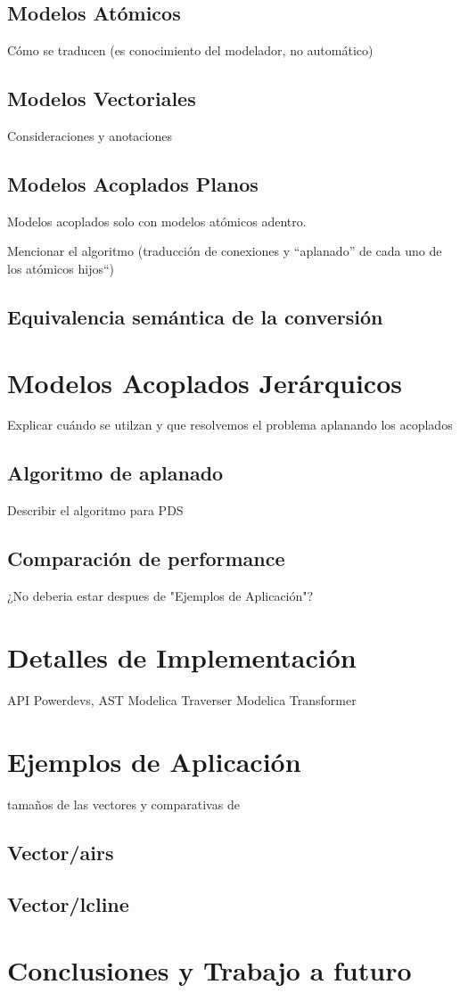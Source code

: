 \documentclass[a4paper,	11pt]{article}
\begin{document}
\subsection{Modelos Atómicos}
Cómo se traducen (es conocimiento del modelador, no automático)
\subsection{Modelos Vectoriales}
Consideraciones  y anotaciones

\subsection{Modelos Acoplados Planos}
Modelos acoplados solo con modelos atómicos adentro.

Mencionar el algoritmo (traducción de conexiones y ``aplanado'' de cada uno de los atómicos hijos``)	

\subsection{Equivalencia semántica de la conversión}

\section{Modelos Acoplados Jerárquicos}
Explicar cuándo se utilzan y que resolvemos el problema aplanando los acoplados

\subsection{Algoritmo de aplanado}
Describir el algoritmo para PDS


\subsection{Comparación de performance}
¿No deberia estar despues de "Ejemplos de Aplicación"?

\section{Detalles de Implementación}
API Powerdevs, AST Modelica
Traverser
Modelica Transformer


\section{Ejemplos de Aplicación}
tamaños de las vectores y comparativas de 
\subsection{Vector/airs}
\subsection{Vector/lcline}

\section{Conclusiones y Trabajo a futuro}


\begin{small}

\end{small}
\end{document}
